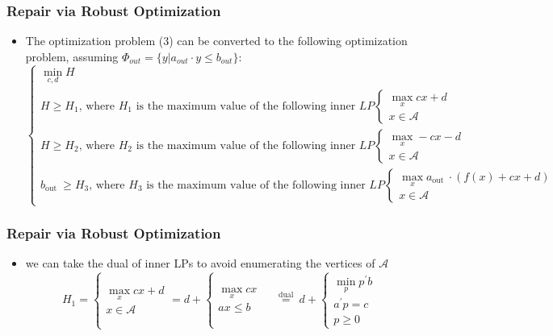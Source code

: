 \documentclass[aspectratio=169 %
,serif,mathserif]{beamer}
\begin{document}
\begin{frame}
	\frametitle{Repair via Robust Optimization}
	\begin{itemize}
		\item The optimization problem (3) can be converted to the following optimization problem, assuming $\Phi_{out} = \{y|a_{out} · y ≤ b_{out}\}$:
		\begin{equation}
			\left\{\begin{array}{l}
				\min _{c, d} H \\
				H \geq H_1 \text {, where } H_1 \text { is the maximum value of the following inner } L P\left\{\begin{array}{l}
				\max _x c x+d \\
				x \in \mathcal{A}
				\end{array}\right. \\
				H \geq H_2 \text {, where } H_2 \text { is the maximum value of the following inner } L P\left\{\begin{array}{l}
				\max _x-c x-d \\
				x \in \mathcal{A}
				\end{array}\right. \\
				b_{\text {out }} \geq H_3 \text {, where } H_3 \text { is the maximum value of the following inner } L P\left\{\begin{array}{l}
				\max _x a_{\text {out }} \cdot(f(x)+cx+d) \\
				x \in \mathcal{A}
				\end{array}\right.
				\end{array}\right.
		\end{equation}
	\end{itemize}
		
\end{frame}

\begin{frame}
	\frametitle{Repair via Robust Optimization}
	\begin{itemize}
		\item we can take the dual of inner LPs to avoid enumerating the vertices of $\mathcal{A}$
		\begin{equation}
			H_1=\left\{\begin{array}{l}
				\max _x c x+d \\
				x \in \mathcal{A}
				\end{array}=d+\left\{\begin{array}{l}
				\max _x c x \\
				a x \leq b
				\end{array} \quad \stackrel{\text { dual }}{=} d+\left\{\begin{array}{l}
				\min _p p^{\prime} b \\
				a^{\prime} p=c \\
				p \geq 0
				\end{array}\right.\right.\right.
		\end{equation}
	\end{itemize}
\end{frame}
\end{document}
